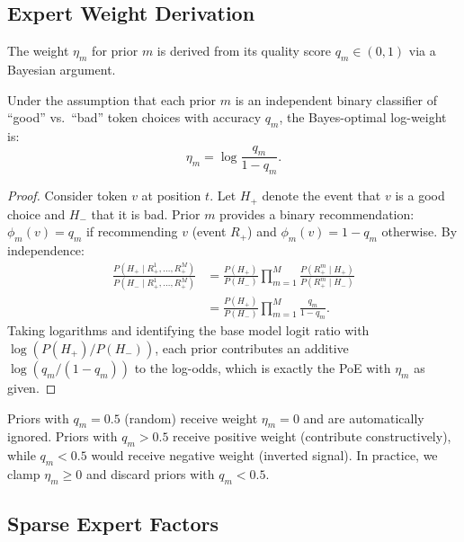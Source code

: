 \subsection{Expert Weight Derivation}

The weight $\eta_m$ for prior $m$ is derived from its quality score $q_m \in (0, 1)$
via a Bayesian argument.

\begin{theorem}
\label{thm:weights}
Under the assumption that each prior $m$ is an independent binary classifier of
``good'' vs.\ ``bad'' token choices with accuracy $q_m$, the Bayes-optimal
log-weight is:
\begin{equation}
    \eta_m = \log \frac{q_m}{1 - q_m}.
    \label{eq:eta-bayes}
\end{equation}
\end{theorem}

\begin{proof}
Consider token $v$ at position $t$. Let $H_+$ denote the event that $v$ is a
good choice and $H_-$ that it is bad. Prior $m$ provides a binary
recommendation: $\phi_m(v) = q_m$ if recommending $v$ (event $R_+$) and
$\phi_m(v) = 1 - q_m$ otherwise. By independence:
\begin{align}
    \frac{P(H_+ \mid R_+^1, \ldots, R_+^M)}{P(H_- \mid R_+^1, \ldots, R_+^M)}
    &= \frac{P(H_+)}{P(H_-)} \prod_{m=1}^M \frac{P(R_+^m \mid H_+)}{P(R_+^m \mid H_-)} \\
    &= \frac{P(H_+)}{P(H_-)} \prod_{m=1}^M \frac{q_m}{1 - q_m}.
\end{align}
Taking logarithms and identifying the base model logit ratio with
$\log(P(H_+)/P(H_-))$, each prior contributes an additive
$\log(q_m / (1 - q_m))$ to the log-odds, which is exactly the PoE with
$\eta_m$ as given.
\end{proof}

\begin{corollary}
Priors with $q_m = 0.5$ (random) receive weight $\eta_m = 0$ and are
automatically ignored. Priors with $q_m > 0.5$ receive positive weight
(contribute constructively), while $q_m < 0.5$ would receive negative weight
(inverted signal). In practice, we clamp $\eta_m \geq 0$ and discard priors
with $q_m < 0.5$.
\end{corollary}

\subsection{Sparse Expert Factors}

